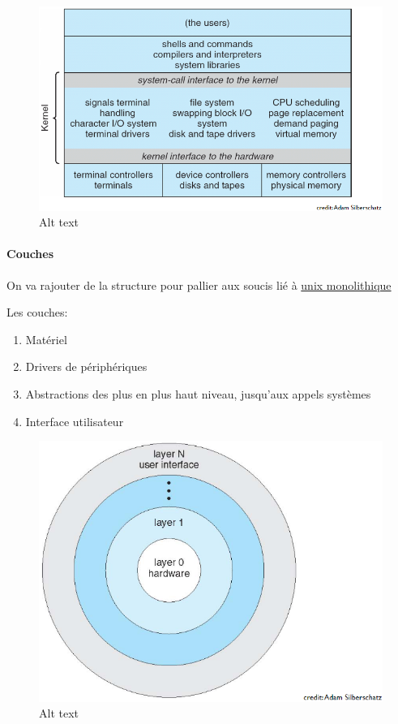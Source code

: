\begin{figure}
\centering
\includegraphics{image-18.png}
\caption{Alt text}
\end{figure}

\paragraph{Couches}\label{couches}

On va rajouter de la structure pour pallier aux soucis lié à
\hyperref[monolithe]{unix monolithique}

Les couches:

\begin{enumerate}
\def\labelenumi{\arabic{enumi}.}
\tightlist
\item
  Matériel
\item
  Drivers de périphériques
\item
  Abstractions des plus en plus haut niveau, jusqu'aux appels systèmes
\item
  Interface utilisateur
\end{enumerate}

\begin{figure}
\centering
\includegraphics{image-19.png}
\caption{Alt text}
\end{figure}

